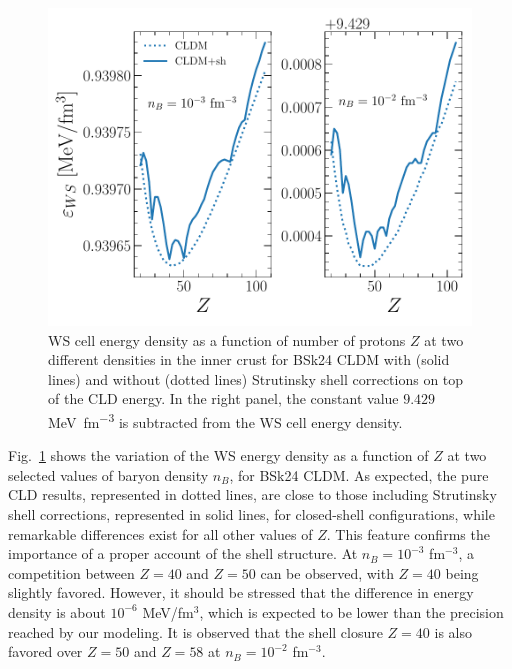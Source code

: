 \begin{figure}[!t]
\begin{center}
  \includegraphics[width=0.9\linewidth]{figures/shcorr_bsk24.pdf}
\end{center}
\caption[Perturbative implementation of proton shell corrections for BSk24]{WS 
  cell energy density as a function of number of protons $Z$ at two
different densities in the inner crust for BSk24 CLDM with (solid lines) and
without (dotted lines) Strutinsky shell corrections on top of the CLD 
energy. {In the right panel, the constant value $9.429$
  \si{\MeV \per \cubic\femto\meter} is 
  subtracted from the WS cell energy density.}}\label{fig:shcorr_bsk24}
\end{figure}

Fig.~\ref{fig:shcorr_bsk24} shows the variation of the WS energy density as a
function of $Z$ at two selected values of baryon density $n_B$, for BSk24 CLDM. 
As expected, the pure CLD results, represented in dotted lines, are close to 
those including Strutinsky shell corrections, represented in solid lines, for 
closed-shell configurations, while remarkable differences exist for all other 
values of $Z$. This feature confirms the importance of a proper account of the 
shell structure. At $n_B = 10^{-3}$ fm$^{-3}$, a competition between $Z=40$ and
$Z=50$ can be observed, with $Z=40$ being slightly favored. However, it should
be stressed that the difference in energy density is about $10^{-6}$ 
MeV/fm$^{3}$, which is expected to be lower than the precision reached by our
modeling. It is observed that the shell closure $Z=40$ is also favored over 
$Z=50$ and $Z=58$ at $n_B = 10^{-2}$ fm$^{-3}$.

